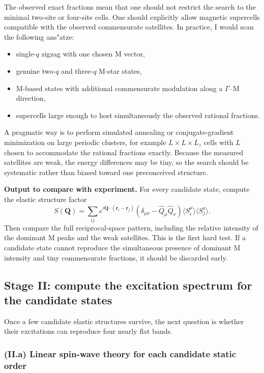 \documentclass[11pt]{article}
\begin{document}
The observed exact fractions mean that one should not restrict the search to the minimal two-site or four-site cells. One should explicitly allow magnetic supercells compatible with the observed commensurate satellites. In practice, I would scan the following ans"atze:
\begin{itemize}[leftmargin=2em,itemsep=0.35em]
    \item single-$q$ zigzag with one chosen M vector,
    \item genuine two-$q$ and three-$q$ M-star states,
    \item M-based states with additional commensurate modulation along a $\Gamma$--M direction,
    \item supercells large enough to host simultaneously the observed rational fractions.
\end{itemize}

A pragmatic way is to perform simulated annealing or conjugate-gradient minimization on large periodic clusters, for example $L\times L\times L_z$ cells with $L$ chosen to accommodate the rational fractions exactly. Because the measured satellites are weak, the energy differences may be tiny, so the search should be systematic rather than biased toward one preconceived structure.

\textbf{Output to compare with experiment.} For every candidate state, compute the elastic structure factor
\begin{equation}
S(\mathbf{Q}) = \sum_{ij} e^{i\mathbf{Q}\cdot(\mathbf{r}_i-\mathbf{r}_j)}\left(\delta_{\mu\nu}-\hat Q_\mu \hat Q_\nu\right)\langle S_i^\mu\rangle \langle S_j^\nu\rangle.
\end{equation}
Then compare the full reciprocal-space pattern, including the relative intensity of the dominant M peaks and the weak satellites. This is the first hard test. If a candidate state cannot reproduce the simultaneous presence of dominant M intensity and tiny commensurate fractions, it should be discarded early.

\subsection{Stage II: compute the excitation spectrum for the candidate states}

Once a few candidate elastic structures survive, the next question is whether their excitations can reproduce four nearly flat bands.

\subsubsection*{(II.a) Linear spin-wave theory for each candidate static order}
\end{document}
